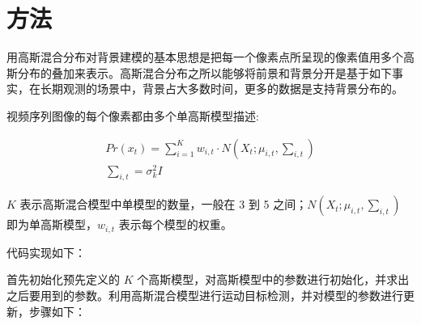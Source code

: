 \section{方法} 
\label{sec:proposed}

用高斯混合分布对背景建模的基本思想是把每一个像素点所呈现的像素值用多个高斯分布的叠加来表示。高斯混合分布之所以能够将前景和背景分开是基于如下事实，在长期观测的场景中，背景占大多数时间，更多的数据是支持背景分布的。

视频序列图像的每个像素都由多个单高斯模型描述: 
\vspace{0.5cm}

\begin{equation}
\begin{gathered}
Pr(x_t) = \sum_{i=1}^Kw_{i,t}\cdot N\left(X_t;\mu_{i,t},\sum\nolimits_{i,t}\right)\\
\sum\nolimits_{i,t}=\sigma_k^2I
\end{gathered}
\end{equation}

\vspace{0.5cm}

$K$ 表示高斯混合模型中单模型的数量，一般在 3 到 5 之间；$N\left(X_t;\mu_{i,t},\sum\nolimits_{i,t}\right)$ 即为单高斯模型，$w_{i,t}$ 表示每个模型的权重。

代码实现如下：

\vspace{0.3cm}


首先初始化预先定义的 $K$ 个高斯模型，对高斯模型中的参数进行初始化，并求出之后要用到的参数。利用高斯混合模型进行运动目标检测，并对模型的参数进行更新，步骤如下：

